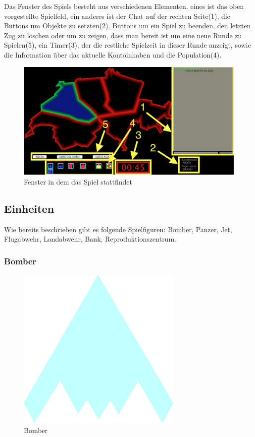 \documentclass[ngerman, 12pt, pdftex]{scrartcl}[2006/07/30]
\begin{document}
Das Fenster des Spiels besteht aus verschiedenen Elementen. eines ist das oben vorgestellte Spielfeld, ein anderes ist der Chat auf der rechten Seite(1), die Buttons um Objekte zu setzten(2),
Buttons um ein Spiel zu beenden, den letzten Zug zu löschen oder um zu zeigen, dass man bereit ist um eine neue Runde zu Spielen(5), ein Timer(3), der die restliche Spielzeit in dieser Runde anzeigt, sowie die Information über das aktuelle Kontoinhaben und die Population(4).

\begin{figure}[h]
\centering
\includegraphics[scale=0.3]{spiel/spielfenster.png}
\caption{Fenster in dem das Spiel stattfindet}
\end{figure}

\newpage

\subsection{Einheiten} \label{subsec:Einheit}

Wie bereits beschrieben gibt es folgende Spielfiguren: Bomber, Panzer, Jet, Flugabwehr, Landabwehr, Bank, Reproduktionszentrum.

\subsubsection{Bomber}

\begin{figure}[h]
\centering
\includegraphics[scale=1.8]{spiel/Bomber.png}
\caption{Bomber}
\end{figure}
\end{document}
